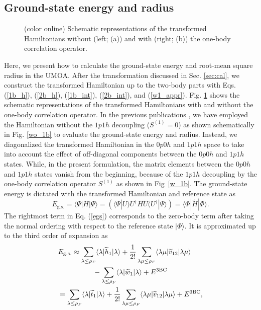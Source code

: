 \documentclass[aps,prc, dvips, twocolumn,groupedaddress,showkeys,showpacs,floatfix,superscriptaddress]{revtex4-1}
\newcommand{\<}{\langle}
\renewcommand{\>}{\rangle}
\begin{document}
\subsection{Ground-state energy and radius \label{sec:ob}}
\begin{figure}[t]
\caption{\label{Tran_H} (color online) Schematic representations of the transformed Hamiltonians
  without (left; (a)) and with (right; (b)) the one-body correlation operator.}
\end{figure}

Here, we present how to calculate the ground-state energy and root-mean square radius in the UMOA.
 After the transformation discussed in Sec. \ref{sec:cal}, we construct the
 transformed Hamiltonian up to the two-body parts with Eqs. (\ref{1b_h}),
 (\ref{2b_h}), (\ref{1b_int}), (\ref{2b_int}), and (\ref{w1_appr}).
Fig. \ref{Tran_H} shows the schematic representations of the transformed Hamiltonians with and without the one-body correlation operator.
In the previous publications \cite{Miyagi:2014,Miyagi:2015}, we have employed
 the Hamiltonian without the $1p1h$ decoupling ($S^{(1)}=0$) as shown schematically in Fig. \ref{wo_1b} to evaluate the ground-state
energy and radius.
Instead, we diagonalized the transformed Hamiltonian in the $0p0h$ and $1p1h$ space
 to take into account the effect of off-diagonal components between the $0p0h$ and $1p1h$ states.
While, in the present formulation, the matrix elements between the $0p0h$ and $1p1h$ states vanish from the beginning,
because of the $1p1h$ decoupling by the one-body correlation operator $S^{(1)}$ as shown in Fig~\ref{w_1b}.
The ground-state energy is dictated with the transformed Hamiltonian and reference state as
\begin{equation}
 \label{egs}
  E_{\text{g.s.}} = \<\Psi|H|\Psi\> =
(\<\Psi|U) U^{\dag}HU (U^{\dag}|\Psi\>)= \<\Phi|\widetilde{H}|\Phi\>.
\end{equation}
The rightmost term in Eq. (\ref{egs}) corresponds to the zero-body term after
taking the normal ordering with respect to the reference state $|\Phi\>$.
It is approximated up to the third order of expansion as
\begin{align}
 \label{egs_2}
 E_{\rm g.s.} &\approx \sum_{\lambda \le \rho_{F}} \<\lambda|
 \widetilde{h}_{1}|\lambda\> +
 \frac{1}{2!}\sum_{\lambda\mu\le\rho_{F}}\<\lambda\mu|\widetilde{v}_{12}|\lambda\mu\>
 \notag \\
&\hspace{3em} -
 \sum_{\lambda\le\rho_{F}}\<\lambda|\widetilde{w}_{1}|\lambda\> + E^{{\rm 3BC}} \\
 \label{egs_3}
 &\hspace{-2em}= \sum_{\lambda \le \rho_{F}} \<\lambda|
 \widetilde{t}_{1}|\lambda\> +
 \frac{1}{2!}\sum_{\lambda\mu\le\rho_{F}}\<\lambda\mu|\widetilde{v}_{12}|\lambda\mu\>
  + E^{{\rm 3BC}},
\end{align}
\end{document}
